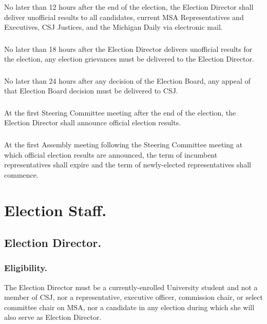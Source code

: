 \subsubsection{}
No later than 12 hours after the end of the election, the Election Director shall deliver unofficial results to all candidates, current MSA Representatives and Executives, CSJ Justices, and the Michigan Daily via electronic mail.

\subsubsection{}
No later than 18 hours after the Election Director delivers unofficial results for the election, any election grievances must be delivered to the Election Director.

\subsubsection{}
No later than 24 hours after any decision of the Election Board, any appeal of that Election Board decision must be delivered to CSJ.

\subsubsection{}
At the first Steering Committee meeting after the end of the election, the Election Director shall announce official election results.

\subsubsection{}
At the first Assembly meeting following the Steering Committee meeting at which official election results are announced, the term of incumbent representatives shall expire and the term of newly-elected representatives shall commence. 

\section{Election Staff.}

\subsection{Election Director.}

\subsubsection{Eligibility.}
The Election Director must be a currently-enrolled University student and not a member of CSJ, nor a representative, executive officer, commission chair, or select committee chair on MSA, nor a candidate in any election during which she will also serve as Election Director.


